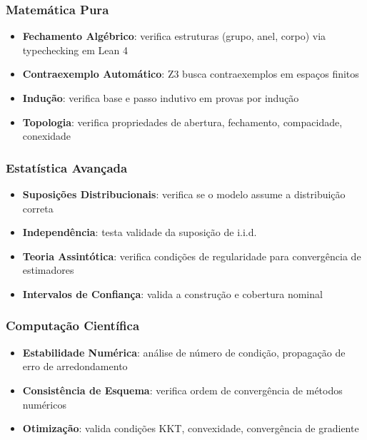\documentclass[5p]{elsarticle}
\theoremstyle{remark}
\begin{document}
\subsubsection{Matemática Pura}

\begin{itemize}
    \item \textbf{Fechamento Algébrico}: verifica estruturas (grupo, anel, corpo) via typechecking em Lean 4
    \item \textbf{Contraexemplo Automático}: Z3 busca contraexemplos em espaços finitos
    \item \textbf{Indução}: verifica base e passo indutivo em provas por indução
    \item \textbf{Topologia}: verifica propriedades de abertura, fechamento, compacidade, conexidade
\end{itemize}

\subsubsection{Estatística Avançada}

\begin{itemize}
    \item \textbf{Suposições Distribucionais}: verifica se o modelo assume a distribuição correta
    \item \textbf{Independência}: testa validade da suposição de i.i.d.
    \item \textbf{Teoria Assintótica}: verifica condições de regularidade para convergência de estimadores
    \item \textbf{Intervalos de Confiança}: valida a construção e cobertura nominal
\end{itemize}

\subsubsection{Computação Científica}

\begin{itemize}
    \item \textbf{Estabilidade Numérica}: análise de número de condição, propagação de erro de arredondamento
    \item \textbf{Consistência de Esquema}: verifica ordem de convergência de métodos numéricos
    \item \textbf{Otimização}: valida condições KKT, convexidade, convergência de gradiente
\end{itemize}
\end{document}
